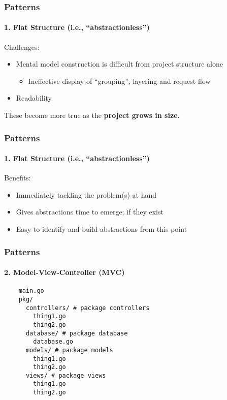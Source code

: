 \begin{frame}[fragile]
  \frametitle{Patterns}
  \framesubtitle{1. Flat Structure (i.e., ``abstractionless'')}

  Challenges:
  \begin{itemize}
    \pause
    \item Mental model construction is difficult from project structure alone
    \begin{itemize}
      \item Ineffective display of ``grouping'', layering and request flow
    \end{itemize}
    \pause
    \item Readability
  \end{itemize}

  \vspace{1em}
  \centering
  \pause
  These become more true as the \textbf{project grows in size}.

\end{frame}

\begin{frame}[fragile]
  \frametitle{Patterns}
  \framesubtitle{1. Flat Structure (i.e., ``abstractionless'')}

  Benefits:
  \begin{itemize}
    \pause
    \item Immediately tackling the problem(s) at hand
    \pause
    \item Gives abstractions time to emerge; if they exist
    \pause
    \item Easy to identify and build abstractions from this point
  \end{itemize}

\end{frame}

\begin{frame}[fragile]
  \frametitle{Patterns}
  \framesubtitle{2. Model-View-Controller (MVC)}

  \begin{verbatim}
    main.go
    pkg/
      controllers/ # package controllers
        thing1.go
        thing2.go
      database/ # package database
        database.go
      models/ # package models
        thing1.go
        thing2.go
      views/ # package views 
        thing1.go
        thing2.go
  \end{verbatim}
\end{frame}

